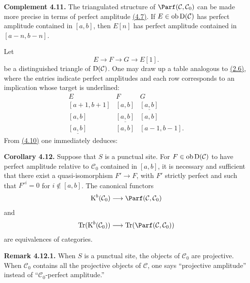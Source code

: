 \textbf{Complement 4.11.} The triangulated structure of \(\Parf(\mathcal C,\mathcal C_0)\) can be made more precise in terms of perfect amplitude \hyperlink{sga6.e01.def.4-7}{(4.7)}. If \(E\in\Ob\Dpx(\mathcal C)\) has perfect amplitude contained in \([a,b]\), then \(E[n]\) has perfect amplitude contained in \([a-n,b-n]\).

Let
\[
  E\longrightarrow F\longrightarrow G\longrightarrow E[1].
\]
be a distinguished triangle of \(\Dpx(\mathcal C)\). One may draw up a table analogous to \hyperlink{sga6.e01.schol.2-6}{(2.6)}, where the entries indicate perfect amplitudes and each row corresponds to an implication whose target is underlined:
\[
\begin{array}{ccc}
E&F&G\\[0.3em]
{}[a+1,b+1]&{}[a,b]&\underline{[a,b]}\\
{}[a,b]&\underline{[a,b]}&{}[a,b]\\
\underline{[a,b]}&{}[a,b]&{}[a-1,b-1].
\end{array}
\]
From \hyperlink{sga6.e01.prop.4-10}{(4.10)} one immediately deduces:

\textbf{Corollary 4.12.} Suppose that \(S\) is a punctual site. For \(F\in\Ob\Dpx(\mathcal C)\) to have perfect amplitude relative to \(\mathcal C_0\) contained in \([a,b]\), it is necessary and sufficient that there exist a quasi-isomorphism \(F'\to F\), with \(F'\) strictly perfect and such that \(F'^i=0\) for \(i\notin[a,b]\). The canonical functors
\[
  \Kpx^b(\mathcal C_0)\longrightarrow\Parf(\mathcal C,\mathcal C_0)
\]
and
\[
  \Tr(\Kpx^b(\mathcal C_0))\longrightarrow\Tr(\Parf(\mathcal C,\mathcal C_0))
\]
are equivalences of categories.

\textbf{Remark 4.12.1.} When \(S\) is a punctual site, the objects of \(\mathcal C_0\) are projective. When \(\mathcal C_0\) contains all the projective objects of \(\mathcal C\), one says ``projective amplitude'' instead of ``\(\mathcal C_0\)-perfect amplitude.''



\providecommand{\Cpx}{\mathrm C}
\providecommand{\Kpx}{\mathrm K}
\providecommand{\Dpx}{\mathrm D}
\providecommand{\Ho}{\mathrm H}
\providecommand{\RHom}{\mathrm R\!\operatorname{Hom}}
\providecommand{\Ob}{\operatorname{ob}}
\providecommand{\qis}{\xrightarrow{\sim}}
\providecommand{\RHom}{\mathrm R\!\Hom}
\providecommand{\Ext}{\operatorname{Ext}}
\providecommand{\Hom}{\operatorname{Hom}}
\providecommand{\Tr}{\operatorname{Tr}}

